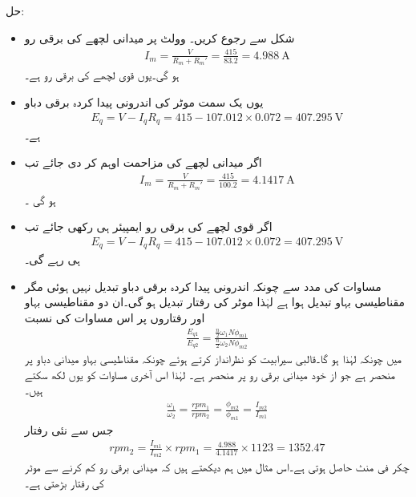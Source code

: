 حل:
\begin{itemize}
\item
شکل   سے رجوع کریں۔ وولٹ پر میدانی لچھے کی برقی رو
\begin{align*}
I_m=\tfrac{V}{R_m+R_m'}=\frac{415}{83.2}=\SI{4.988}{\ampere}
\end{align*}
ہو گی۔یوں قوی لچھے کی برقی رو  ہے۔
\item
یوں یک سمت  موٹر کی اندرونی پیدا کردہ برقی دباو
\begin{align*}
E_q=V-I_q R_q=415-107.012\times 0.072=\SI{407.295}{\volt}
\end{align*}
ہے۔
\item
اگر میدانی لچھے کی مزاحمت  اوہم کر دی جائے  تب
\begin{align*}
I_m=\frac{V}{R_m+R_m'}=\frac{415}{100.2}=\SI{4.1417}{\ampere}
\end{align*}
ہو گی ۔
\item
اگر قوی لچھے کی برقی رو  ایمپیئر ہی رکھی جائے تب 
\begin{align*}
E_q=V-I_q R_q=415-107.012 \times 0.072=\SI{407.295}{\volt}
\end{align*}
ہی رہے گی۔
\item
مساوات   کی مدد سے  چونکہ اندرونی پیدا کردہ برقی دباو تبدیل نہیں ہوئی مگر مقناطیسی بہاو تبدیل ہوا ہے لہٰذا موٹر کی رفتار تبدیل ہو گی۔ان دو مقناطیسی بہاو اور رفتاروں پر اس مساوات کی نسبت
\begin{align*}
\frac{E_{q1}}{E_{q2}}=\frac{\frac{n}{2} \omega_1 N \phi_{m1}}{\frac{n}{2} \omega_2 N \phi_{m2}}
\end{align*}
میں چونکہ  لہٰذا  ہو گا۔قالبی سیرابیت کو نظرانداز کرتے ہوئے چونکہ مقناطیسی بہاو میدانی دباو پر منحصر ہے جو از خود میدانی برقی رو پر منحصر ہے۔ لہٰذا اس آخری مساوات کو یوں لکھ سکتے ہیں۔
\begin{align*}
\frac{\omega_1}{\omega_2}=\frac{rpm_1}{rpm_2}=\frac{\phi_{m2}}{\phi_{m1}}=\frac{I_{m2}}{I_{m1}}
\end{align*}
جس سے نئی رفتار
\begin{align*}
rpm_2=\frac{I_{m1}}{I_{m2}} \times rpm_1=\frac{4.988}{4.1417} \times 1123=1352.47
\end{align*}
چکر فی منٹ حاصل ہوتی ہے۔اس مثال میں ہم دیکھتے ہیں کہ میدانی برقی رو کم کرنے سے موٹر کی رفتار بڑھتی ہے۔
\end{itemize}
%
